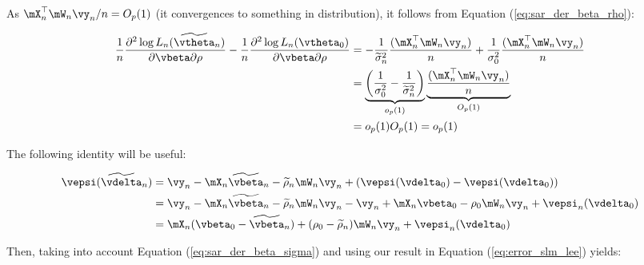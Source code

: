 \begin{subappendices}
\begin{enumerate}
   
   As $\mX_n^\top\mW_n\vy_n /n = O_p(1)$ (it convergences to something in distribution), it follows from Equation (\ref{eq:sar_der_beta_rho}):
   
   \begin{equation*}
    \begin{aligned}
    \frac{1}{n}\frac{\partial^2 \log L_n(\widetilde{\vtheta}_n)}{\partial \vbeta \partial \rho} - \frac{1}{n}\frac{\partial^2 \log L_n(\vtheta_0)}{\partial \vbeta \partial \rho} & = - \frac{1}{\widetilde{\sigma}^2_n}\frac{(\mX^\top_n \mW_n\vy_n)}{n} + \frac{1}{\sigma^2_0}\frac{(\mX^\top_n \mW_n\vy_n)}{n} \\
    & = \underbrace{\left(\frac{1}{\sigma^2_0} - \frac{1}{\widetilde{\sigma}^2_n}\right)}_{o_p(1)}\underbrace{\frac{(\mX^\top_n \mW_n\vy_n)}{n}}_{O_p(1)} \\
    & = o_p(1)O_p(1)  = o_p(1)
    \end{aligned}
   \end{equation*} 
   
   The following identity will be useful:
   
   \begin{equation}\label{eq:error_slm_lee}
    \begin{aligned}
    \vepsi(\widetilde{\vdelta}_n) & = \vy_n - \mX_n\widetilde{\vbeta}_n - \widetilde{\rho}_n\mW_n\vy_n +(\vepsi(\vdelta_0) -  \vepsi(\vdelta_0)) \\
    & = \vy_n - \mX_n\widetilde{\vbeta}_n - \widetilde{\rho}_n\mW_n\vy_n - \vy_n + \mX_n\vbeta_0 - \rho_0\mW_n\vy_n + \vepsi_n(\vdelta_0) \\
    & = \mX_n(\vbeta_0 - \widetilde{\vbeta}_n) + (\rho_0 - \widetilde{\rho}_n)\mW_n\vy_n + \vepsi_n(\vdelta_0) 
    \end{aligned}
   \end{equation}
   
   Then, taking into account Equation (\ref{eq:sar_der_beta_sigma}) and using our result in Equation (\ref{eq:error_slm_lee}) yields:
   

\end{enumerate}
\end{subappendices}
